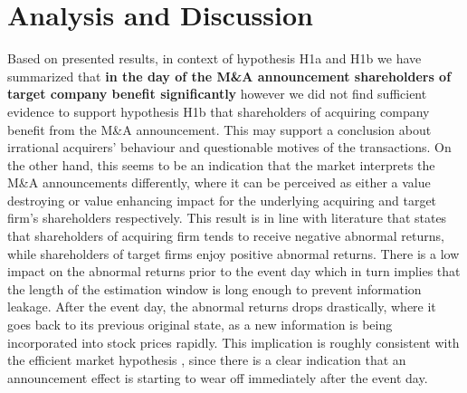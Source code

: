 \documentclass[preprint,10pt]{elsarticle}
\begin{document}



\section{Analysis and Discussion}\label{Discussion}

Based on presented results, in context of hypothesis H1a and H1b we have summarized that \textbf{in the day of the M\&A announcement shareholders of target company benefit significantly} however we did not find sufficient evidence to support hypothesis H1b that shareholders of acquiring company benefit from the M\&A announcement. This may support a conclusion about irrational acquirers' behaviour and questionable motives of the transactions. On the other hand, this seems to be an indication that the market interprets the M\&A announcements differently, where it can be perceived as either a value destroying or value enhancing impact for the underlying acquiring and target firm's shareholders respectively. This result is in line with  literature \cite{Campa} that states that shareholders of acquiring firm tends to receive negative abnormal returns, while shareholders of target firms enjoy positive abnormal returns. There is a low impact on the abnormal returns prior to the event day which in turn implies that the length of the estimation window is long enough to prevent information leakage. After the event day, the abnormal returns %
drops drastically, where it goes back to its previous original state, as a new information is being incorporated into stock prices rapidly. This implication is roughly consistent with the efficient market hypothesis \cite{fama1991}, since there is a clear indication that an announcement effect is starting to wear off immediately after the event day.

\end{document}
